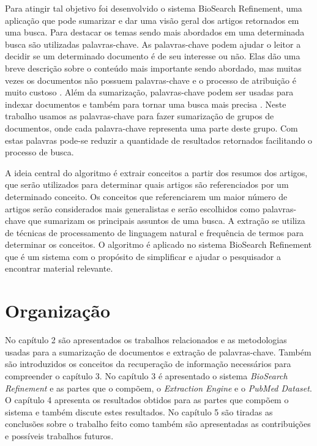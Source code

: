 Para atingir tal objetivo foi desenvolvido o sistema BioSearch Refinement, uma aplicação que pode sumarizar e dar uma visão geral dos artigos retornados em uma busca. Para destacar os temas sendo mais abordados em uma determinada busca são utilizadas palavras-chave. As palavras-chave podem ajudar o leitor a decidir se um determinado documento é de seu interesse ou não. Elas dão uma breve descrição sobre o conteúdo mais importante sendo abordado, mas muitas vezes os documentos não possuem palavras-chave e o processo de atribuição é muito custoso \cite{Lui2007}. Além da sumarização, palavras-chave podem ser usadas para indexar documentos e também para tornar uma busca mais precisa \cite{Turney1999}. Neste trabalho usamos as palavras-chave para fazer sumarização de grupos de documentos, onde cada palavra-chave representa uma parte deste grupo. Com estas palavras pode-se reduzir a quantidade de resultados retornados facilitando o processo de busca.

A ideia central do algoritmo é extrair  conceitos a partir dos resumos dos artigos, que serão utilizados para determinar quais artigos são referenciados por um determinado conceito. Os conceitos que referenciarem um maior número de artigos serão considerados mais generalistas e serão escolhidos como palavras-chave que sumarizam os principais assuntos de uma busca. A extração se utiliza de técnicas de processamento de linguagem natural e frequência de termos para determinar os conceitos. O algoritmo é aplicado no sistema BioSearch Refinement que é um sistema com o propósito de simplificar e ajudar o pesquisador a encontrar material relevante.

\section{Organização}
No capítulo 2 são apresentados os trabalhos relacionados e as metodologias usadas para a sumarização de documentos e extração de palavras-chave. Também são introduzidos os conceitos da recuperação de informação necessários para compreender o capítulo 3. No capítulo 3 é apresentado o sistema \emph{BioSearch Refinement} e as partes que o compõem, o \emph{Extraction Engine} e o \emph{PubMed Dataset}. O capítulo 4  apresenta os resultados obtidos para as partes que compõem o sistema e também discute estes resultados. No capítulo 5 são tiradas as conclusões sobre o trabalho feito como também são apresentadas as contribuições e possíveis trabalhos futuros.

